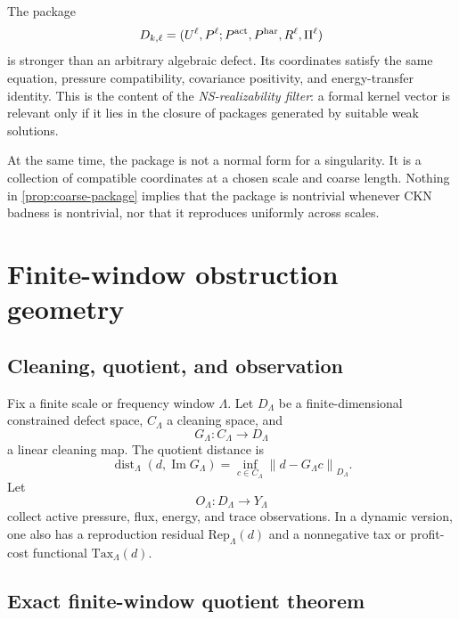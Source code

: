 \documentclass[11pt]{article}
\numberwithin{equation}{section}
\theoremstyle{remark}
\DeclareMathOperator{\dist}{dist}
\newcommand{\norm}[2]{\left\|#1\right\|_{#2}}
\newcommand{\Tax}{\mathrm{Tax}}
\newcommand{\Rep}{\mathrm{Rep}}
\begin{document}
The package
\begin{equation}\label{eq:D-package}
D_{k,\ell}=(U^\ell,P^\ell;P^{\rm act},P^{\rm har},R^\ell,\Pi^\ell)
\end{equation}
is stronger than an arbitrary algebraic defect. Its coordinates satisfy the same equation, pressure compatibility, covariance positivity, and energy-transfer identity. This is the content of the \emph{NS-realizability filter}: a formal kernel vector is relevant only if it lies in the closure of packages generated by suitable weak solutions.

At the same time, the package is not a normal form for a singularity. It is a collection of compatible coordinates at a chosen scale and coarse length. Nothing in \cref{prop:coarse-package} implies that the package is nontrivial whenever CKN badness is nontrivial, nor that it reproduces uniformly across scales.

\section{Finite-window obstruction geometry}\label{sec:finite-window}

\subsection{Cleaning, quotient, and observation}

Fix a finite scale or frequency window $\Lambda$. Let $D_\Lambda$ be a finite-dimensional constrained defect space, $C_\Lambda$ a cleaning space, and
\[
G_\Lambda:C_\Lambda\to D_\Lambda
\]
a linear cleaning map. The quotient distance is
\begin{equation}\label{eq:quot-distance}
\dist_\Lambda(d,\operatorname{Im}G_\Lambda)
=
\inf_{c\in C_\Lambda}\norm{d-G_\Lambda c}{D_\Lambda}.
\end{equation}
Let
\[
O_\Lambda:D_\Lambda\to Y_\Lambda
\]
collect active pressure, flux, energy, and trace observations. In a dynamic version, one also has a reproduction residual $\Rep_\Lambda(d)$ and a nonnegative tax or profit-cost functional $\Tax_\Lambda(d)$.

\subsection{Exact finite-window quotient theorem}
\end{document}

